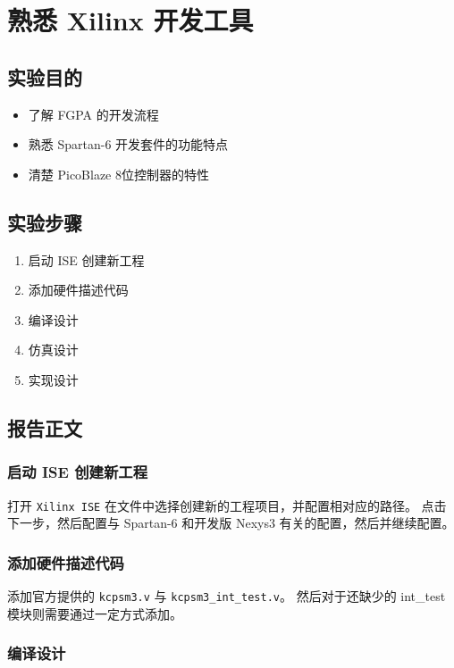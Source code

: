 \documentclass{ctexart}
\begin{document}
\section{熟悉 Xilinx 开发工具}

\subsection{实验目的}

\begin{itemize}
    \item 了解 FGPA 的开发流程
    \item 熟悉 Spartan-6 开发套件的功能特点
    \item 清楚 PicoBlaze 8位控制器的特性
\end{itemize}

\subsection{实验步骤}

\begin{enumerate}
    \item 启动 ISE 创建新工程
    \item 添加硬件描述代码
    \item 编译设计
    \item 仿真设计
    \item 实现设计
\end{enumerate}

\subsection{报告正文}

\subsubsection{启动 ISE 创建新工程}

打开 \verb|Xilinx ISE| 在文件中选择创建新的工程项目，并配置相对应的路径。
点击下一步，然后配置与 Spartan-6 和开发版 Nexys3 有关的配置，然后并继续配置。

\subsubsection{添加硬件描述代码}

添加官方提供的 \verb|kcpsm3.v| 与 \verb|kcpsm3_int_test.v|。
然后对于还缺少的 int\_test 模块则需要通过一定方式添加。

\subsubsection{编译设计}
\end{document}
